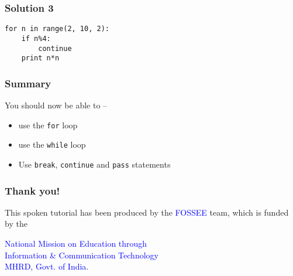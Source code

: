 \documentclass[presentation]{beamer}
\begin{document}
\begin{frame}[fragile]
\frametitle{Solution 3}
\label{sec-7}

\lstset{language=Python}
\begin{lstlisting}
for n in range(2, 10, 2):
    if n%4:
        continue      
    print n*n
\end{lstlisting}
\end{frame}
\begin{frame}
\frametitle{Summary}
\label{sec-8}

  You should now be able to --
\begin{itemize}
\item use the \texttt{for} loop
\item use the \texttt{while} loop
\item Use \texttt{break}, \texttt{continue} and \texttt{pass} statements
\end{itemize}
\end{frame}
\begin{frame}
\frametitle{Thank you!}
\label{sec-9}

  \begin{block}{}
  \begin{center}
  This spoken tutorial has been produced by the
  \textcolor{blue}{FOSSEE} team, which is funded by the 
  \end{center}
  \begin{center}
    \textcolor{blue}{National Mission on Education through \\
      Information \& Communication Technology \\ 
      MHRD, Govt. of India}.
  \end{center}  
  \end{block}
\end{frame}
\end{document}
